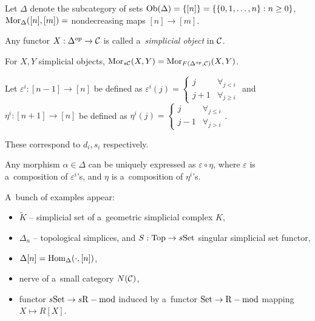     \begin{definition}
        Let $\Delta$ denote the subcategory of sets
        $\operatorname{Ob}(\Delta) = \{ [n]\} = \{ \{0,1,\ldots, n\} : n \geq 0 \}$,
        $\operatorname{Mor}_\Delta([n],[m]) = $ nondecreasing maps $[n] \to [m]$.
    \end{definition}
    
    \begin{definition}
        Any functor $X:\Delta^{op} \to \mathcal{C}$ is called
        a~{\em simplicial object} in $\mathcal{C}$.
    \end{definition}
    
    \begin{definition}
        For $X, Y$ simplicial objects,
        $\operatorname{Mor}_{s\mathcal{C}}(X,Y) = \operatorname{Mor}_{F(\Delta^{op},\mathcal{C})}(X,Y)$.
    \end{definition}
    
    \begin{definition}
        Let $\varepsilon^i:[n-1]\to[n]$
        be defined as
        $\varepsilon^i(j) = 
        \begin{cases}
            j & \forall_{j<i} \\
            j+1 & \forall_{j \geq i}
        \end{cases}$
        and $\eta^i:[n+1] \to [n]$
        be defined as
        $\eta^i(j) =
        \begin{cases}
            j & \forall_{j \leq i} \\
            j-1 & \forall_{j>i}
        \end{cases}$.
    \end{definition}
    
    \begin{remark}
        These correspond to $d_i, s_i$ respectively.
    \end{remark}
    
    \begin{proposition}
        Any morphism $\alpha \in \Delta$
        can be uniquely expressed as $\varepsilon \circ \eta$,
        where $\varepsilon$ is a~composition of
        $\varepsilon^i$'s, and $\eta$
        is a~composition of $\eta^i$'s.
    \end{proposition}
    \pagebreak
    \begin{remark}
        A~bunch of examples appear:
        \begin{itemize}
            \item $\tilde{K}$ -- simplicial set 
            of a~geometric simplicial complex $K$,
            \item $\Delta_n$ -- topological simplices,
            and $S:\mathrm{Top} \to s\mathrm{Set}$ singular simplicial set
            functor,
            \item $\Delta[n] = \operatorname{Hom}_\Delta(\cdot, [n])$,
            \item nerve of a~small category $N(\mathcal{C})$,
            \item functor $s\mathrm{Set} \to s\mathrm{R-mod}$
            induced by a~functor $\mathrm{Set} \to \mathrm{R-mod}$
            mapping $X \mapsto R[X]$.
        \end{itemize}
    \end{remark}
    

